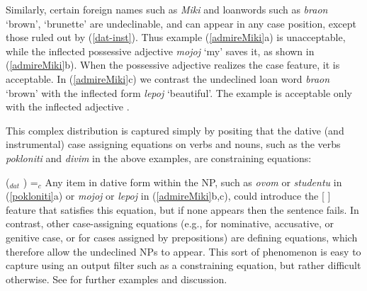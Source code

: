 \begin{sloppypar}
\noindent
  Similarly, certain foreign names such as \textit{Miki} and loanwords such as \emph{braon} `brown', `brunette' are undeclinable, and can appear in any case position, except those ruled out by (\ref{dat-inst}).  Thus  example (\ref{admireMiki}a) is unacceptable, while the inflected possessive
adjective \emph{mojoj} `my'  saves it, as shown in (\ref{admireMiki}b).   When the possessive adjective realizes the case
feature, it is acceptable.  In  (\ref{admireMiki}c) we contrast the undeclined loan word {\it
braon} `brown' with the inflected form \emph{lepoj} `beautiful'.  The example is acceptable only
with the inflected adjective \citep[134]{WZ2003a}.  
\end{sloppypar}

\begin{exe} 
\ex	\label{admireMiki} 
\begin{xlist}
\end{xlist}
\end{exe}

\noindent
This complex distribution is captured simply by positing that the dative (and instrumental) case assigning equations on verbs and nouns, such as the verbs \textit{pokloniti} and \textit{divim} in the above examples, are constraining equations:

\ea
(\up {}$_{dat}$ ) =$_c$ 
\z
Any item in dative form within the NP, such as \textit{ovom} or \textit{studentu} in (\ref{pokloniti}a) or \textit{mojoj} or \textit{lepoj} in (\ref{admireMiki}b,c), could introduce the [ ] feature that satisfies this equation, but if none appears then the sentence fails.  In contrast, other case-assigning equations (e.g., for nominative, accusative, or genitive case, or for cases assigned by prepositions) are defining equations, which therefore allow the undeclined NPs to appear.  This sort of phenomenon is easy to capture using an output filter such as a constraining equation, but rather difficult otherwise.  See \citet{wechsler2001case} for further examples and discussion.  

